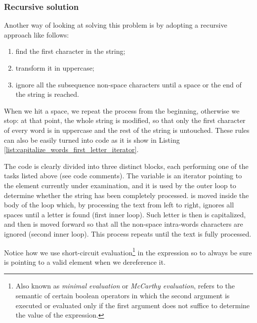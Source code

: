 \subsubsection{Recursive solution}

Another way of looking at solving this problem is by adopting a recursive approach like follows:
\begin{enumerate}
	\item find the first character in the string; 
	\item transform it in uppercase;
	\item ignore all the subsequence non-space characters until a space or the end of the string is reached.
\end{enumerate}
When we hit a space, we repeat the process from the beginning, otherwise we stop: at that point, the whole string is modified, so that only the first character of every word is in uppercase and the rest of the string is untouched.
These rules can also be easily turned into code as it is show in Listing \ref{list:capitalize_words_first_letter_iterator}.



The code is clearly divided into three distinct blocks, each performing one of the tasks listed above (see code comments).
The variable  is an iterator pointing to the element currently under examination, and it is used by the outer loop to determine whether the string has been completely processed.
 is moved inside the body of the loop which, by processing the text from left to right, ignores all spaces until a letter is found (first inner loop).
Such letter is then is capitalized, and then  is moved forward so that all the non-space intra-words characters are ignored (second inner loop).
This process repeats until the text is fully processed. 


Notice how we use short-circuit evaluation\footnote{Also known as \textit{minimal evaluation} or \textit{McCarthy evaluation}, refers to the semantic of certain boolean operators in which the second argument is executed or evaluated only if the first argument does not suffice to determine the value of the expression.}\cite{cit:wiki:shortcircuit}
in the  expression so to always be sure  is pointing to a valid element when we dereference it.

